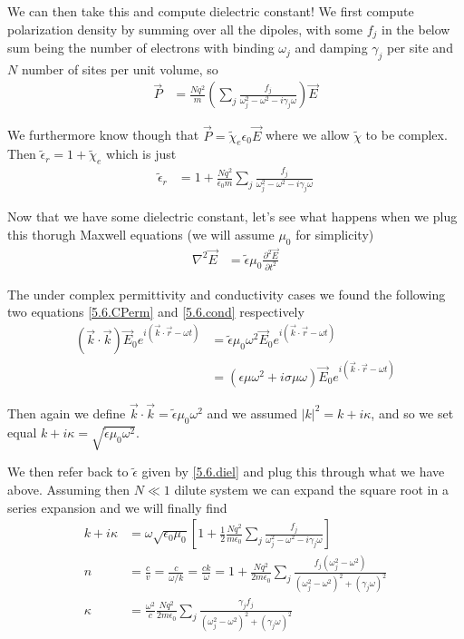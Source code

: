 \documentclass[10pt]{report}
\newcommand{\ptd}[2]{\frac{\partial^2 #1}{\partial#2^2}}
\newcommand{\abs}[1]{\left|#1\right|}
\begin{document}
We can then take this and compute dielectric constant! We first compute polarization density by summing over all the dipoles, with some $f_j$ in the below sum being the number of electrons with binding $\omega_j$ and damping $\gamma_j$ per site and $N$ number of sites per unit volume, so
\begin{align}
    \vec{P} &= \frac{Nq^2}{m}\left( \sum_{j}^{}\frac{f_j}{\omega_j^2 - \omega^2 - i\gamma_j\omega} \right)\vec{E}
\end{align}

We furthermore know though that $\vec{P} = \tilde{\chi}_e \epsilon_0 \vec{E}$ where we allow $\tilde{\chi}$ to be complex. Then $\tilde{\epsilon}_r = 1 + \tilde{\chi}_e$ which is just
\begin{align}
    \tilde{\epsilon}_r &= 1 + \frac{Nq^2}{\epsilon_0m}\sum_{j}^{}\frac{f_j}{\omega_j^2 - \omega^2 - i\gamma_j\omega}\label{5.6.diel}
\end{align}

Now that we have some dielectric constant, let's see what happens when we plug this thorugh Maxwell equations (we will assume $\mu_0$ for simplicity)
\begin{align}
    \nabla^2 \vec{E} &= \tilde{\epsilon}\mu_0 \ptd{\vec{E}}{t}
\end{align}

The under complex permittivity and conductivity cases we found the following two equations \eqref{5.6.CPerm} and \eqref{5.6.cond} respectively
\begin{align}
    \left(\vec{k} \cdot \vec{k}\right) \vec{E}_0 e^{i\left( \vec{k} \cdot \vec{r} - \omega t \right)} &= \tilde{\epsilon}\mu_0 \omega^2 \vec{E}_0 e^{i\left( \vec{k} \cdot \vec{r} - \omega t \right)}\label{5.6.CPerm}\\
    &= \left( \epsilon \mu \omega^2 + i\sigma \mu \omega \right)\vec{E}_0 e^{i\left( \vec{k} \cdot \vec{r} - \omega t \right)}\label{5.6.cond}
\end{align}

Then again we define $\vec{k} \cdot \vec{k} = \tilde{\epsilon} \mu_0 \omega^2$ and we assumed $\abs{k}^2 = k + i\kappa$, and so we set equal $k + i\kappa = \sqrt{\tilde{\epsilon}\mu_0 \omega^2}$.

We then refer back to $\tilde{\epsilon}$ given by \eqref{5.6.diel} and plug this through what we have above. Assuming then $N \ll 1$ dilute system we can expand the square root in a series expansion and we will finally find
\begin{align}
    k + i\kappa &= \omega \sqrt{\epsilon_0 \mu_0}\left[ 1 + \frac{1}{2}\frac{Nq^2}{m\epsilon_0}\sum_{j}^{}\frac{f_j}{\omega_j^2 - \omega^2 - i\gamma_j \omega} \right]\\
    n &= \frac{c}{v} = \frac{c}{\omega/k} = \frac{ck}{\omega} = 1 + \frac{Nq^2}{2m\epsilon_0}\sum_{j}^{}\frac{f_j(\omega_j^2 - \omega^2)}{(\omega_j^2 - \omega^2)^2 + (\gamma_j \omega)^2}\\
    \kappa &= \frac{\omega^2}{c}\frac{Nq^2}{2m\epsilon_0}\sum_{j}^{}\frac{\gamma_j f_j}{\left( \omega_j^2 - \omega^2 \right)^2 + \left( \gamma_j \omega \right)^2}
\end{align}
\end{document}
